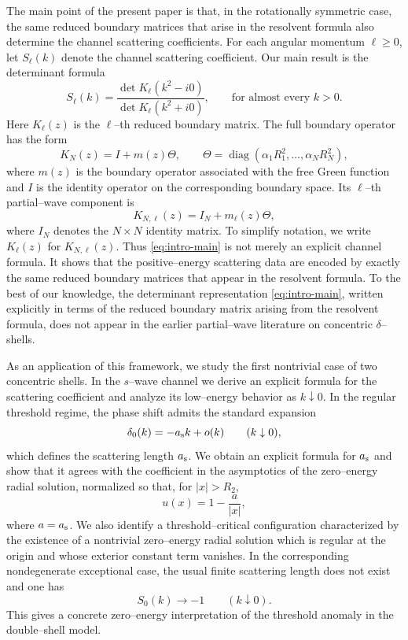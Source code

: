 \documentclass[a4paper,11pt]{article}
\numberwithin{equation}{section}
\newcommand{\diag}{\operatorname{diag}}
\theoremstyle{definition}
\theoremstyle{remark}
\begin{document}
The main point of the present paper is that, in the rotationally symmetric
case, the same reduced boundary matrices that arise in the resolvent formula
also determine the channel scattering coefficients. For each angular
momentum $\ell\ge0$, let $S_\ell(k)$ denote the channel scattering
coefficient. Our main result is the determinant formula
\begin{equation}\label{eq:intro-main}
S_\ell(k)
=
\frac{\det K_\ell(k^2-i0)}{\det K_\ell(k^2+i0)},
\qquad \text{for almost every } k>0.
\end{equation}
Here $K_\ell(z)$ is the $\ell$--th reduced boundary matrix. The full boundary
operator has the form
$$
K_N(z)=I+m(z)\Theta,
\qquad
\Theta=\diag(\alpha_1R_1^2,\ldots,\alpha_NR_N^2),
$$
where $m(z)$ is the boundary operator associated with the free Green
function and $I$ is the identity operator on the corresponding boundary
space. Its $\ell$--th partial--wave component is
$$
K_{N,\ell}(z)=I_N+m_\ell(z)\Theta,
$$
where $I_N$ denotes the $N\times N$ identity matrix. To simplify notation, we
write $K_\ell(z)$ for $K_{N,\ell}(z)$. 
Thus \eqref{eq:intro-main} is not merely an explicit channel formula. 
It shows that the positive--energy scattering data are encoded by exactly the same
reduced boundary matrices that appear in the resolvent formula. 
To the best of our knowledge, the determinant representation
\eqref{eq:intro-main}, written explicitly in terms of the reduced boundary
matrix arising from the resolvent formula, does not appear in the earlier
partial--wave literature on concentric $\delta$--shells.

As an application of this framework, we study the first nontrivial case of
two concentric shells. In the $s$--wave channel we derive an explicit formula
for the scattering coefficient and analyze its low--energy behavior as
$k\downarrow0$. In the regular threshold regime, the phase shift admits the
standard expansion
\begin{equation}\label{eq:intro-scatt-length}
\delta_0(k)=-a_{\rm s}k+o(k)
\qquad (k\downarrow0),
\end{equation}
which defines the scattering length $a_{\rm s}$. We obtain an explicit
formula for $a_{\rm s}$ and show that it agrees with the coefficient in the
asymptotics of the zero--energy radial solution, normalized so that, for
$|x|>R_2$,
$$
u(x)=1-\frac{a}{|x|},
$$
where $a=a_{\rm s}$. We also identify a threshold--critical configuration
characterized by the existence of a nontrivial zero--energy radial solution
which is regular at the origin and whose exterior constant term vanishes. In
the corresponding nondegenerate exceptional case, the usual finite
scattering length does not exist and one has
$$
S_0(k)\to -1
\qquad (k\downarrow0).
$$
This gives a concrete zero--energy interpretation of the threshold anomaly
in the double--shell model.
\end{document}
